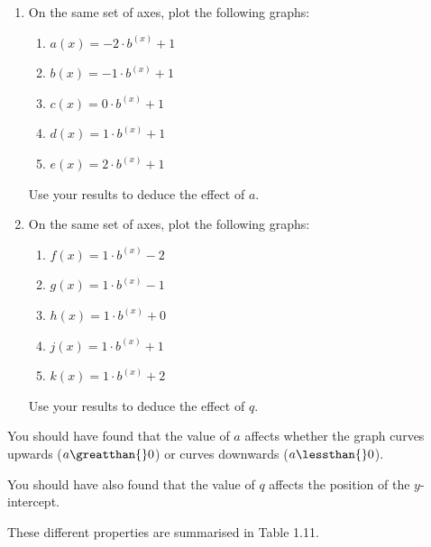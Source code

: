 \label{m39348*id249746}\begin{enumerate}[noitemsep, label=\textbf{\arabic*}. ] 
\label{m39348*uid174}\item On the same set of axes, plot the following graphs:
\label{m39348*id249761}\begin{enumerate}[noitemsep, label=\textbf{\alph*}. ] 
\label{m39348*uid175}\item $a\left(x\right)=-2\ensuremath{\cdot}{b}^{\left(x\right)}+1$\label{m39348*uid176}\item $b\left(x\right)=-1\ensuremath{\cdot}{b}^{\left(x\right)}+1$\label{m39348*uid177}\item $c\left(x\right)=0\ensuremath{\cdot}{b}^{\left(x\right)}+1$\label{m39348*uid178}\item $d\left(x\right)=1\ensuremath{\cdot}{b}^{\left(x\right)}+1$\label{m39348*uid179}\item $e\left(x\right)=2\ensuremath{\cdot}{b}^{\left(x\right)}+1$\end{enumerate}
Use your results to deduce the effect of $a$.
\label{m39348*uid180}\item On the same set of axes, plot the following graphs:
\label{m39348*id250057}\begin{enumerate}[noitemsep, label=\textbf{\alph*}. ] 
\label{m39348*uid181}\item $f\left(x\right)=1\ensuremath{\cdot}{b}^{\left(x\right)}-2$\label{m39348*uid182}\item $g\left(x\right)=1\ensuremath{\cdot}{b}^{\left(x\right)}-1$\label{m39348*uid183}\item $h\left(x\right)=1\ensuremath{\cdot}{b}^{\left(x\right)}+0$\label{m39348*uid184}\item $j\left(x\right)=1\ensuremath{\cdot}{b}^{\left(x\right)}+1$\label{m39348*uid185}\item $k\left(x\right)=1\ensuremath{\cdot}{b}^{\left(x\right)}+2$\end{enumerate}
Use your results to deduce the effect of $q$.
\end{enumerate}
\label{m39348*id250340}You should have found that the value of $a$ affects whether the graph curves upwards ($a\greatthan{}0$) or curves downwards ($a\lessthan{}0$).\par 
\label{m39348*id250385}You should have also found that the value of $q$ affects the position of the $y$-intercept.\par 
\label{m39348*id250408}These different properties are summarised in Table 1.11.\par 
